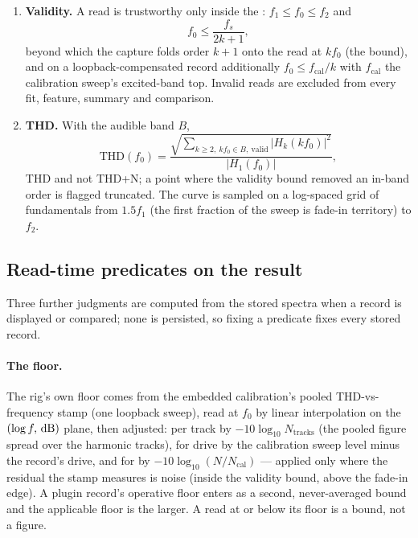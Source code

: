 \documentclass[11pt,a4paper]{article}
\begin{document}
\begin{enumerate}
\item \textbf{Validity.} \label{sec:hd-validity} A read is trustworthy only
inside the : $f_1 \le f_0 \le f_2$ and
\begin{equation}
  f_0 \le \frac{f_s}{2k+1},
  \label{eq:validity}
\end{equation}
beyond which the capture folds order $k+1$ onto the read at $k f_0$ (the
 bound), and on a loopback-compensated record additionally
$f_0 \le f_{\mathrm{cal}}/k$ with $f_{\mathrm{cal}}$ the calibration sweep's
excited-band top. Invalid reads are excluded from every fit, feature,
summary and comparison.

\item \textbf{THD.} With the audible band $B$,
\begin{equation}
  \mathrm{THD}(f_0) = \frac{\sqrt{\sum_{k \ge 2,\ k f_0 \in B,\ \mathrm{valid}} |H_k(k f_0)|^2}}{|H_1(f_0)|},
  \label{eq:thd}
\end{equation}
THD and not THD+N; a point where the validity bound removed an in-band
order is flagged truncated. The curve is sampled on a log-spaced grid of
fundamentals from $1.5 f_1$ (the first fraction of the sweep is
fade-in territory) to $f_2$.
\end{enumerate}

\subsection{Read-time predicates on the result}
\label{sec:hd-predicates}
Three further judgments are computed from the stored spectra when a record
is displayed or compared; none is persisted, so fixing a predicate fixes every
stored record.

\paragraph{The floor.}\label{sec:hd-floor}
The rig's own floor comes from the embedded calibration's pooled THD-vs-
frequency stamp (one loopback sweep), read at $f_0$ by linear interpolation
on the $(\log f, \,\mathrm{dB})$ plane, then adjusted: per track by $-10\log_{10}
N_{\mathrm{tracks}}$ (the pooled figure spread over the harmonic tracks),
for drive by the calibration sweep level minus the record's drive, and for
 by $-10\log_{10}(N/N_{\mathrm{cal}})$ --- applied only
where the residual the stamp measures is noise (inside the validity bound,
above the fade-in edge). A plugin record's operative floor enters as a
second, never-averaged bound and the applicable floor is the larger. A read
at or below its floor is a bound, not a figure.
\end{document}
